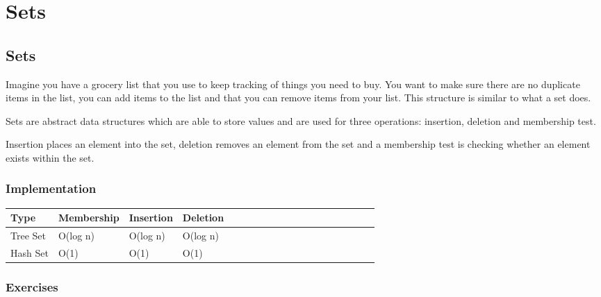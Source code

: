\documentclass[11pt,oneside]{book}
\begin{document}
    \chapter{ Sets }
        \section{ Sets }
        

Imagine you have a grocery list that you use to keep tracking of things you need to buy. You want to make sure there are no duplicate items in the list, you can add items to the list and that you can remove items from your list. This structure is similar to what a set does.

Sets are abstract data structures which are able to store values and are used for three operations: insertion, deletion and membership test.

Insertion places an element into the set, deletion removes an element from the set and a membership test is checking whether an element exists within the set.

\subsection{Implementation}

\vspace{10pt} \begin{tabulary}{0.4\linewidth}{|l|l|l|l|l|l|l|l|l|l|l|l|l|l|l|l|l|l|l}\hline


  Type &
  Membership &
  Insertion &
  Deletion\\
\hline


  Tree Set &
  O(log n) &
  O(log n) &
  O(log n)\\

  Hash Set &
  O(1) &
  O(1) &
  O(1)\\

\hline\end{tabulary}

\subsection{Exercises}
\end{document}
